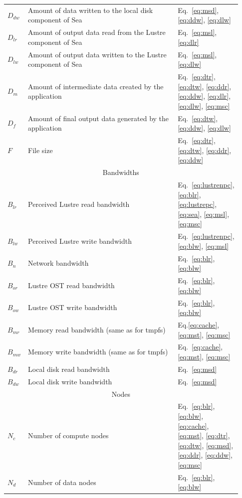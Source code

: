 \documentclass{report}
\begin{document}
\begin{table}
\begin{tabular}{|p{0.03\linewidth}|p{0.7\linewidth}|p{0.2\linewidth}|}
     $D_{dw}$ & Amount of data written to the local disk component of Sea & Eq.~\ref{eq:msd}, \ref{eq:ddw}, \ref{eq:dlw} \\
     $D_{lr}$ & Amount of output data read from the Lustre component of Sea & Eq.~\ref{eq:msl}, \ref{eq:dlr} \\
     $D_{lw}$ & Amount of output data written to the Lustre component of Sea & Eq.~\ref{eq:msl}, \ref{eq:dlw} \\
     $D_{m}$ & Amount of intermediate data created by the application & Eq.~\ref{eq:dtr}, \ref{eq:dtw}, \ref{eq:ddr}, \ref{eq:ddw}, \ref{eq:dlr}, \ref{eq:dlw}, \ref{eq:msc} \\
     $D_{f}$ & Amount of final output data generated by the application & Eq.~\ref{eq:dtw}, \ref{eq:ddw}, \ref{eq:dlw} \\ 
     $F$ & File size & Eq.~\ref{eq:dtr}, \ref{eq:dtw}, \ref{eq:ddr}, \ref{eq:ddw}\\
     \hline
     \multicolumn{3}{|c|}{Bandwidths} \\
     \hline
     $B_{lr}$ & Perceived Lustre read bandwidth & Eq.~\ref{eq:lustrenpc}, \ref{eq:blr}, \ref{eq:lustrepc}, \ref{eq:sea}, \ref{eq:msl}, \ref{eq:msc}\\
     $B_{lw}$ & Perceived Lustre write bandwidth & Eq.~\ref{eq:lustrenpc}, \ref{eq:blw}, \ref{eq:msl}\\
     $B_{n}$ & Network bandwidth & Eq.~\ref{eq:blr}, \ref{eq:blw}\\
     $B_{or}$ & Lustre OST read bandwidth & Eq.~\ref{eq:blr}, \ref{eq:blw}\\
     $B_{ow}$ & Lustre OST write bandwidth & Eq.~\ref{eq:blr}, \ref{eq:blw}\\
     $B_{mr}$ & Memory read bandwidth (same as for tmpfs) & Eq.\ref{eq:cache}, \ref{eq:mst}, \ref{eq:msc}\\
     $B_{mw}$ & Memory write bandwidth (same as for tmpfs) & Eq.~\ref{eq:cache}, \ref{eq:mst}, \ref{eq:msc}\\
     $B_{dr}$ & Local disk read bandwidth & Eq.~\ref{eq:msd}\\
     $B_{dw}$ & Local disk write bandwidth & Eq.~\ref{eq:msd}\\
     \hline
     \multicolumn{3}{|c|}{Nodes} \\
     \hline
     $N_{c}$ & Number of compute nodes & Eq.~\ref{eq:blr}, \ref{eq:blw}, \ref{eq:cache}, \ref{eq:mst}, \ref{eq:dtr}, \ref{eq:dtw}, \ref{eq:msd}, \ref{eq:ddr}, \ref{eq:ddw}, \ref{eq:msc}\\
     $N_{d}$ & Number of data nodes & Eq.~\ref{eq:blr}, \ref{eq:blw}\\

\end{tabular}
\end{table}
\end{document}
